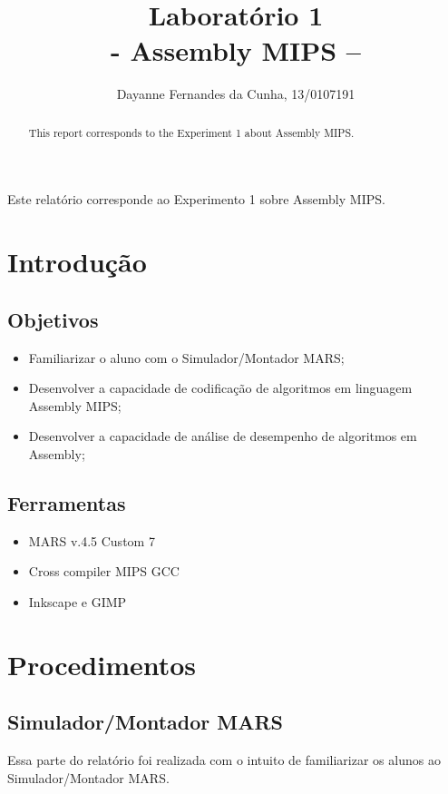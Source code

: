 \documentclass[12pt]{article}
\title{Laboratório 1\\- Assembly MIPS –}
\author{Dayanne Fernandes da Cunha, 13/0107191}
\begin{document}
 
\maketitle

 \begin{abstract}
	This report corresponds to the Experiment 1 about Assembly MIPS.
 \end{abstract}
 \begin{resumo} 
	Este relatório corresponde ao Experimento 1 sobre Assembly MIPS.
 \end{resumo}

\section{Introdução}
\label{sec:Introducao}

\subsection{Objetivos}
\label{sec:Objetivos}

\begin{itemize}
\item Familiarizar o aluno com o Simulador/Montador MARS;
\item Desenvolver a capacidade de codificação de algoritmos em linguagem Assembly MIPS;
\item Desenvolver a capacidade de análise de desempenho de algoritmos em Assembly;
\end{itemize}

\subsection{Ferramentas} 
\label{sec:Materiais}

\begin{itemize}
\item MARS v.4.5 Custom 7
\item Cross compiler MIPS GCC
\item Inkscape e GIMP
\end{itemize}

\section{Procedimentos}
\label{sec:Procedimentos}

\subsection{Simulador/Montador MARS}
\label{subsec:mars}
Essa parte do relatório foi realizada com o intuito de familiarizar os alunos ao Simulador/Montador MARS.
\end{document}
